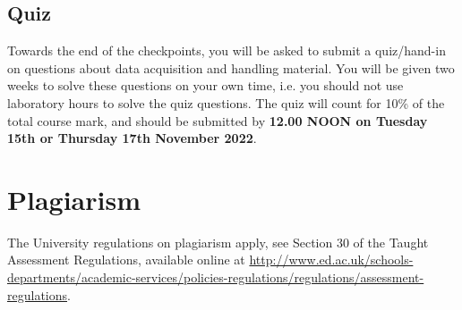 \subsection{Quiz}

Towards the end of the checkpoints, you will be asked to submit a quiz/hand-in on questions about data acquisition and handling material.
You will be given two weeks to solve these questions on your own time, i.e. you should not use laboratory hours to solve the quiz questions.
The quiz will count for 10\% of the total course mark, and should be submitted by {\bf 12.00 NOON on Tuesday 15th or Thursday 17th November 2022}.

\section{Plagiarism}

The University regulations on plagiarism apply, see Section 30 of the Taught Assessment Regulations, available online at \url{http://www.ed.ac.uk/schools-departments/academic-services/policies-regulations/regulations/assessment-regulations}.
